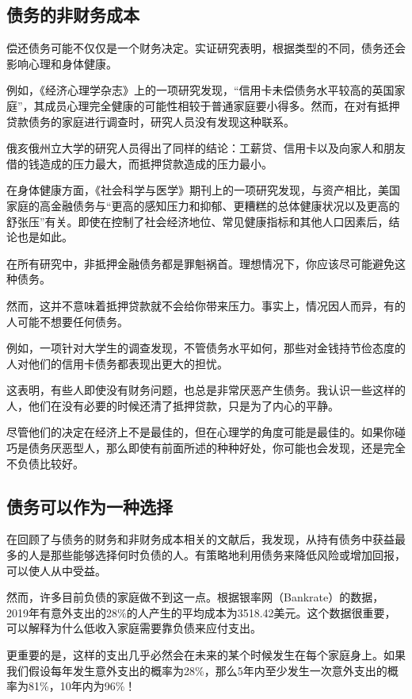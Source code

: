 \subsection{债务的非财务成本}
偿还债务可能不仅仅是一个财务决定。实证研究表明，根据类型的不同，债务还会影响心理和身体健康。

例如，《经济心理学杂志》上的一项研究发现，“信用卡未偿债务水平较高的英国家庭”，其成员心理完全健康的可能性相较于普通家庭要小得多。然而，在对有抵押贷款债务的家庭进行调查时，研究人员没有发现这种联系。

俄亥俄州立大学的研究人员得出了同样的结论：工薪贷、信用卡以及向家人和朋友借的钱造成的压力最大，而抵押贷款造成的压力最小。

在身体健康方面，《社会科学与医学》期刊上的一项研究发现，与资产相比，美国家庭的高金融债务与“更高的感知压力和抑郁、更糟糕的总体健康状况以及更高的舒张压”有关。即使在控制了社会经济地位、常见健康指标和其他人口因素后，结论也是如此。

在所有研究中，非抵押金融债务都是罪魁祸首。理想情况下，你应该尽可能避免这种债务。

然而，这并不意味着抵押贷款就不会给你带来压力。事实上，情况因人而异，有的人可能不想要任何债务。

例如，一项针对大学生的调查发现，不管债务水平如何，那些对金钱持节俭态度的人对他们的信用卡债务都表现出更大的担忧。

这表明，有些人即使没有财务问题，也总是非常厌恶产生债务。我认识一些这样的人，他们在没有必要的时候还清了抵押贷款，只是为了内心的平静。

尽管他们的决定在经济上不是最佳的，但在心理学的角度可能是最佳的。如果你碰巧是债务厌恶型人，那么即使有前面所述的种种好处，你可能也会发现，还是完全不负债比较好。

\subsection{债务可以作为一种选择}
在回顾了与债务的财务和非财务成本相关的文献后，我发现，从持有债务中获益最多的人是那些能够选择何时负债的人。有策略地利用债务来降低风险或增加回报，可以使人从中受益。

然而，许多目前负债的家庭做不到这一点。根据银率网（Bankrate）的数据，2019年有意外支出的28\%的人产生的平均成本为3518.42美元。这个数据很重要，可以解释为什么低收入家庭需要靠负债来应付支出。

更重要的是，这样的支出几乎必然会在未来的某个时候发生在每个家庭身上。如果我们假设每年发生意外支出的概率为28\%，那么5年内至少发生一次意外支出的概率为81\%，10年内为96\%！

